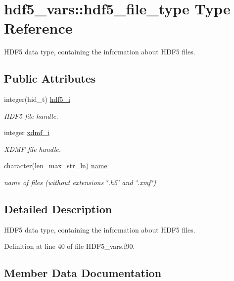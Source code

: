 \hypertarget{structhdf5__vars_1_1hdf5__file__type}{}\section{hdf5\+\_\+vars\+:\+:hdf5\+\_\+file\+\_\+type Type Reference}
\label{structhdf5__vars_1_1hdf5__file__type}


H\+D\+F5 data type, containing the information about H\+D\+F5 files.  


\subsection*{Public Attributes}
\begin{DoxyCompactItemize}
\item 
integer(hid\+\_\+t) \hyperlink{structhdf5__vars_1_1hdf5__file__type_a41637d11bd3c0b05ddd33f19c2814443}{hdf5\+\_\+i}
\begin{DoxyCompactList}\small\item\em H\+D\+F5 file handle. \end{DoxyCompactList}\item 
integer \hyperlink{structhdf5__vars_1_1hdf5__file__type_aceb5b42fcc6d848f1b0faaa9042b1a95}{xdmf\+\_\+i}
\begin{DoxyCompactList}\small\item\em X\+D\+MF file handle. \end{DoxyCompactList}\item 
character(len=max\+\_\+str\+\_\+ln) \hyperlink{structhdf5__vars_1_1hdf5__file__type_a1739de1996623e79605d5000ffe97156}{name}
\begin{DoxyCompactList}\small\item\em name of files (without extensions \char`\"{}.\+h5\char`\"{} and \char`\"{}.\+xmf\char`\"{}) \end{DoxyCompactList}\end{DoxyCompactItemize}


\subsection{Detailed Description}
H\+D\+F5 data type, containing the information about H\+D\+F5 files. 

Definition at line 40 of file H\+D\+F5\+\_\+vars.\+f90.



\subsection{Member Data Documentation}
\mbox{\label{structhdf5__vars_1_1hdf5__file__type_a41637d11bd3c0b05ddd33f19c2814443}} 

